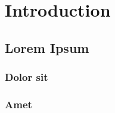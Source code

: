 \chapter{Introduction}
\section{Lorem Ipsum}
\lipsum[1]
\subsection{Dolor sit}
\lipsum[2]
\subsection{Amet}
\lipsum[3]

